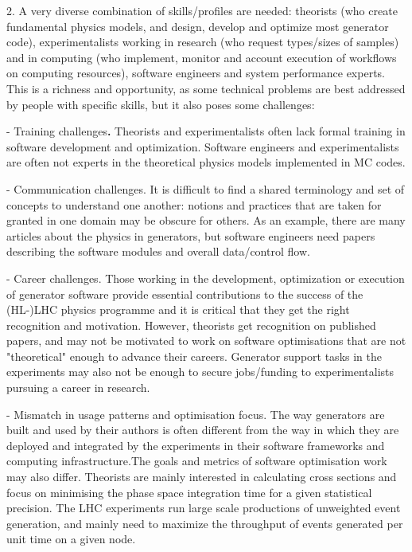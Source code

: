 \documentclass[10pt,a4paper]{article}
\begin{document}
2. {A very diverse combination of skills/profiles are needed}: theorists
(who create fundamental physics models, and design, develop and optimize
most generator code), experimentalists working in research (who request
types/sizes of samples) and in computing (who implement, monitor and
account execution of workflows on computing resources), software
engineers and system performance experts. This is a richness and
opportunity, as some technical problems are best addressed by people
with specific skills, but it also poses some challenges:

- {Training challenges}\textbf{.} Theorists and experimentalists often
lack formal training in software development and optimization. Software
engineers and experimentalists are often not experts in the theoretical
physics models implemented in MC codes.

- {Communication challenges}. It is difficult to find a shared
terminology and set of concepts to understand one another: notions and
practices that are taken for granted in one domain may be obscure for
others. As an example, there are many articles about the physics in
generators, but software engineers need papers describing the software
modules and overall data/control flow.

- {Career challenges}. Those working in the development, optimization or
execution of generator software provide essential contributions to the
success of the (HL-)LHC physics programme and it is critical that they
get the right recognition and motivation. However, theorists get
recognition on published papers, and may not be motivated to work on
software optimisations that are not "theoretical" enough to advance
their careers. Generator support tasks in the experiments may also not
be enough to secure jobs/funding to experimentalists pursuing a career
in research.

- {Mismatch in usage patterns and optimisation focus}. The way
generators are built and used by their authors is often different from
the way in which they are deployed and integrated by the experiments in
their software frameworks and computing infrastructure.The goals and
metrics of software optimisation work may also differ. Theorists are
mainly interested in calculating cross sections and focus on minimising
the phase space integration time for a given statistical precision. The
LHC experiments run large scale productions of unweighted event
generation, and mainly need to maximize the throughput of events
generated per unit time on a given node.
\end{document}
